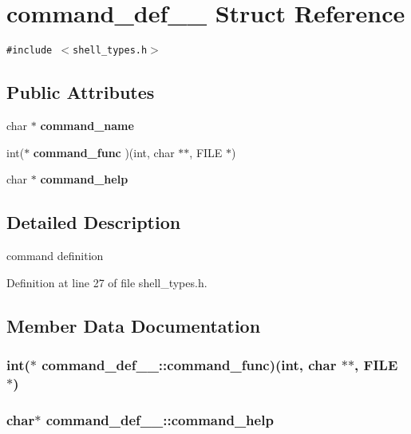 \section{command\_\-def\_\-\_\- Struct Reference}
\label{structcommand__def____}
{\tt \#include $<$shell\_\-types.h$>$}

\subsection*{Public Attributes}
\begin{CompactItemize}
\item 
char $\ast$ {\bf command\_\-name}
\item 
int($\ast$ {\bf command\_\-func} )(int, char $\ast$$\ast$, FILE $\ast$)
\item 
char $\ast$ {\bf command\_\-help}
\end{CompactItemize}


\subsection{Detailed Description}
command definition 

Definition at line 27 of file shell\_\-types.h.

\subsection{Member Data Documentation}
\subsubsection[{command\_\-func}]{\setlength{\rightskip}{0pt plus 5cm}int($\ast$ {\bf command\_\-def\_\-\_\-::command\_\-func})(int, char $\ast$$\ast$, FILE $\ast$)}\label{structcommand__def_____69f8d07ba9009b5a333eed7ff5a20c17}


\subsubsection[{command\_\-help}]{\setlength{\rightskip}{0pt plus 5cm}char$\ast$ {\bf command\_\-def\_\-\_\-::command\_\-help}}\label{structcommand__def_____4251bac8477b9c896e6f411ea2081bd9}




